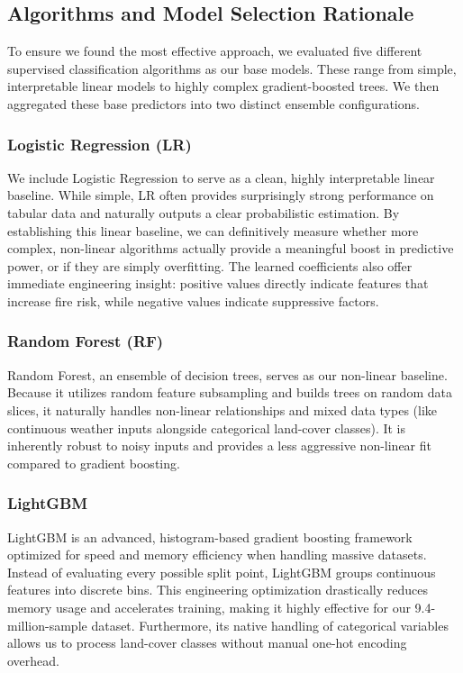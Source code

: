 \subsection{Algorithms and Model Selection Rationale}

To ensure we found the most effective approach, we evaluated five different supervised classification algorithms as our base models. These range from simple, interpretable linear models to highly complex gradient-boosted trees. We then aggregated these base predictors into two distinct ensemble configurations.

\subsubsection{Logistic Regression (LR)}

We include Logistic Regression to serve as a clean, highly interpretable linear baseline. While simple, LR often provides surprisingly strong performance on tabular data and naturally outputs a clear probabilistic estimation. By establishing this linear baseline, we can definitively measure whether more complex, non-linear algorithms actually provide a meaningful boost in predictive power, or if they are simply overfitting. The learned coefficients also offer immediate engineering insight: positive values directly indicate features that increase fire risk, while negative values indicate suppressive factors.

\subsubsection{Random Forest (RF)}

Random Forest, an ensemble of decision trees, serves as our non-linear baseline. Because it utilizes random feature subsampling and builds trees on random data slices, it naturally handles non-linear relationships and mixed data types (like continuous weather inputs alongside categorical land-cover classes). It is inherently robust to noisy inputs and provides a less aggressive non-linear fit compared to gradient boosting.

\subsubsection{LightGBM}

LightGBM is an advanced, histogram-based gradient boosting framework optimized for speed and memory efficiency when handling massive datasets. Instead of evaluating every possible split point, LightGBM groups continuous features into discrete bins. This engineering optimization drastically reduces memory usage and accelerates training, making it highly effective for our 9.4-million-sample dataset. Furthermore, its native handling of categorical variables allows us to process land-cover classes without manual one-hot encoding overhead.

